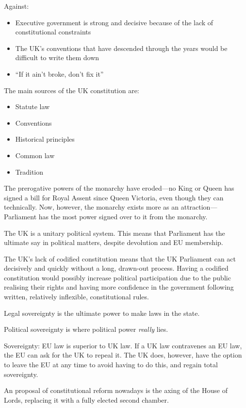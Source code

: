 \documentclass[12pt]{article}
\begin{document}
Against:
\begin{itemize}
	\item{Executive government is strong and decisive because of the lack of constitutional constraints}
	\item{The UK's conventions that have descended through the years would be difficult to write them down}
	\item{``If it ain't broke, don't fix it''}
\end{itemize}

The main sources of the UK constitution are:

\begin{itemize}
	\item{Statute law}
	\item{Conventions}
	\item{Historical principles}
	\item{Common law}
	\item{Tradition}
\end{itemize}

The prerogative powers of the monarchy have eroded---no King or Queen has signed a bill for Royal Assent since Queen Victoria, even though they can technically.  Now, however, the monarchy exists more as an attraction---Parliament has the most power signed over to it from the monarchy.

The UK is a unitary political system.  This means that Parliament has the ultimate say in political matters, despite devolution and EU membership.

The UK's lack of codified constitution means that the UK Parliament can act decisively and quickly without a long, drawn-out process.  Having a codified constitution would possibly increase political participation due to the public realising their rights and having more confidence in the government following written, relatively inflexible, constitutional rules.

Legal sovereignty is the ultimate power to make laws in the state.

Political sovereignty is where political power \textit{really} lies.

Sovereignty: EU law is superior to UK law.  If a UK law contravenes an EU law, the EU can ask for the UK to repeal it.  The UK does, however, have the option to leave the EU at any time to avoid having to do this, and regain total sovereignty.

An proposal of constitutional reform nowadays is the axing of the House of Lords, replacing it with a fully elected second chamber.
\end{document}
